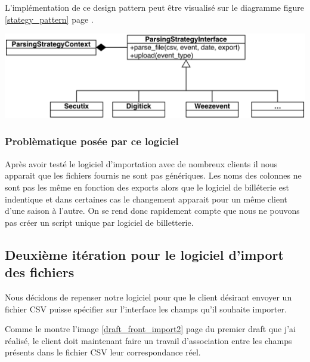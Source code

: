 L'implémentation de ce design pattern peut être visualisé sur le diagramme figure \ref{stategy_pattern} page \pageref{dict_csv}.

\begin{center}
\includegraphics[scale=0.75]{Images/StrategyPattern.png}
\label{stategy_pattern}
\end{center}



\subsubsection{Problèmatique posée par ce logiciel}
Après avoir testé le logiciel d'importation avec de nombreux clients il nous apparait que les fichiers fournis ne sont pas génériques. 
Les noms des colonnes ne sont pas les même en fonction des exports alors que le logiciel de billéterie est indentique et dans certaines cas le changement apparait pour un même client d'une saison à l'autre. 
On se rend donc rapidement compte que nous ne pouvons pas créer un script unique par logiciel de billetterie.

\subsection{Deuxième itération pour le logiciel d'import des fichiers}
Nous décidons de repenser notre logiciel pour que le client désirant envoyer un fichier CSV puisse spécifier sur l'interface les champs qu'il souhaite importer.

Comme le montre l'image \ref{draft_front_import2} page \pageref{draft_front_import2} du premier draft que j'ai réalisé, le client doit maintenant faire un travail d'association entre les champs présents dans le fichier CSV leur correspondance réel. 


